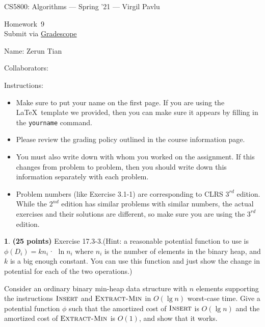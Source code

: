 \documentclass[11pt]{article}
\newcommand{\yourname}{Zerun Tian}
\newcommand{\yourcollaborators}{}
\theoremstyle{definition}
\newcommand{\instructor}{Virgil Pavlu}
\newcommand{\hwnum}{9}
\theoremstyle{theorem}
\newtheorem{prob}{}
\begin{document}
{\Large 
\begin{center}{CS5800: Algorithms} --- Spring '21 --- \instructor \end{center}}
{\large
\vspace{10pt}
\noindent Homework~\hwnum \vspace{2pt}\\
Submit via \href{https://www.gradescope.com/courses/232127}{Gradescope}}

\bigskip
{\large \noindent Name: \yourname }

{\large \noindent Collaborators: \yourcollaborators}

\vspace{15pt}

{\large \noindent Instructions:}

\begin{itemize}

\item Make sure to put your name on the first page.  If you are using the \LaTeX~template we provided, then you can make sure it appears by filling in the \texttt{yourname} command.

\item Please review the grading policy outlined in the course information page.

\item You must also write down with whom you worked on the assignment.  If this changes from problem to problem, then you should write down this information separately with each problem.

\item Problem numbers (like Exercise 3.1-1) are corresponding to CLRS $3^{rd}$ edition.  While the  $2^{nd}$ edition  has  similar  problems  with  similar  numbers,  the  actual  exercises  and their solutions are different, so make sure you are using the $3^{rd}$ edition.

\end{itemize}

\newpage
\begin{prob} \textbf{(25 points)} Exercise 17.3-3.(Hint:  a reasonable potential function to use is $\phi(D_i) =kn_i$· $\ln n_i$ where $n_i$ is the number of elements in the binary heap,  and $k$ is a big enough constant.  You can use this function and just show the change in potential for each of the two operations.)
\end{prob}

Consider an ordinary binary min-heap data structure with $n$ elements supporting the instructions $\textproc{\textsc{Insert}}$ and $\textproc{\textsc{Extract-Min}}$ in $O(\lg n)$ worst-case time. Give a potential function $\phi$ such that the amortized cost of $\textproc{\textsc{Insert}}$ is $O(\lg n)$ and the amortized cost of $\textproc{\textsc{Extract-Min}}$ is $O(1)$, and show that it works.
\end{document}
